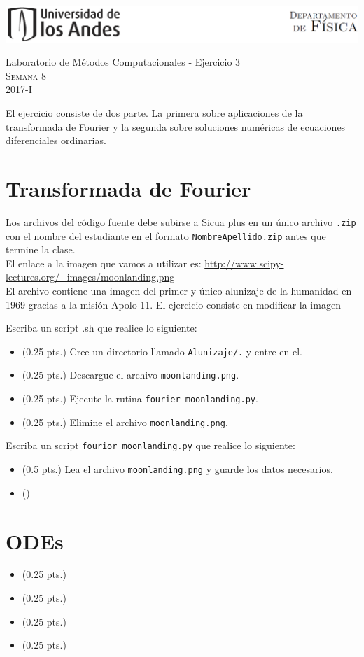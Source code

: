 \documentclass[11pt,letterpaper]{exam}
\begin{document}
\begin{center}

\includegraphics[width=16cm]{header.png}

\vspace{1.0cm}
{\Large Laboratorio de M\'etodos Computacionales - Ejercicio 3} \\
\textsc{Semana 8}\\
2017-I\\
\end{center}

\vspace{0.5cm}

\noindent
El ejercicio consiste de dos parte. La primera sobre aplicaciones de la transformada de Fourier y la segunda sobre soluciones num\'ericas de ecuaciones diferenciales ordinarias.
\section{Transformada de Fourier}
Los archivos del c\'odigo fuente debe subirse a Sicua plus en un \'unico archivo \verb'.zip' con el nombre del estudiante en el formato \verb"NombreApellido.zip" antes que termine la clase.
\noindent
\\El enlace a la imagen que vamos a utilizar es:
\url{http://www.scipy-lectures.org/_images/moonlanding.png}\\
\noindent
El archivo contiene una imagen del primer y \'unico alunizaje de la humanidad en 1969 gracias a la misi\'on Apolo 11.
El ejercicio consiste en modificar la imagen
\vspace{0.5cm}
\begin{questions}
\question[0.8] Escriba un script .sh que realice lo siguiente:
	\begin{itemize}
		\item (0.25 pts.) Cree un directorio llamado \verb'Alunizaje/.' y entre en el. 
		\item (0.25 pts.) Descargue el archivo \verb'moonlanding.png'.
		\item (0.25 pts.) Ejecute la rutina \verb'fourier_moonlanding.py'.
		\item (0.25 pts.) Elimine el archivo \verb'moonlanding.png'.
	\end{itemize}
\question[1.7] Escriba un script \verb'fourior_moonlanding.py' que realice lo siguiente:
	\begin{itemize}
		\item (0.5 pts.) Lea el archivo \verb'moonlanding.png' y guarde los datos necesarios.
		\item ()
	\end{itemize}
\end{questions}
\section{ODEs}
\begin{questions}
\question[0.8]
	\begin{itemize}
		\item (0.25 pts.)  
		\item (0.25 pts.) 
		\item (0.25 pts.) 
		\item (0.25 pts.) 
	\end{itemize}
\question[1.7]
\end{questions}
\end{document}
